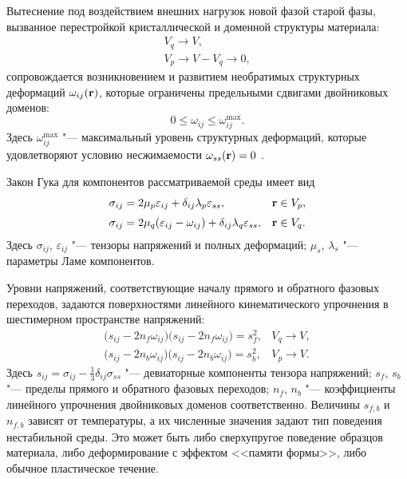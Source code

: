 Вытеснение под воздействием внешних нагрузок новой фазой старой фазы, вызванное перестройкой кристаллической и доменной структуры материала:
\begin{gather*}
V_{q} \to V,\\
V_{p} \to V-V_{q} \to 0,
\end{gather*}
сопровождается возникновением и развитием необратимых структурных деформаций $\omega_{ij}(\bold{r})$, которые ограничены предельными сдвигами двойниковых доменов:
$$
0 \leq \omega_{ij} \leq \omega^{\max}_{ij}.
$$
Здесь  $\omega^{\max}_{ij}$ "--- максимальный уровень структурных деформаций, которые удовлетворяют условию несжимаемости $\omega_{ss}(\bold{r})=0$ .

Закон Гука для компонентов рассматриваемой среды имеет вид 
\begin{equation}
\label{srv:eq1}
\begin{array}{ll}
\sigma_{ij}=2\mu_{p}\varepsilon_{ij}+\delta_{ij}\lambda_{p}\varepsilon_{ss}, & \bold{r} \in V_{p}, \\[2mm]
\sigma_{ij}=2\mu_{q}(\varepsilon_{ij}-\omega_{ij})+\delta_{ij}\lambda_{q}\varepsilon_{ss}, & \bold{r} \in V_{q}.
\end{array}
\end{equation}
Здесь $\sigma_{ij}$, $\varepsilon_{ij}$ "--- тензоры напряжений и полных деформаций; 
$\mu_{s}$, $\lambda_{s}$ "--- параметры Ламе компонентов. 

Уровни напряжений, соответствующие началу прямого и обратного фазовых переходов, задаются поверхностями линейного кинематического упрочнения в шестимерном пространстве напряжений:
\begin{equation}
\label{srv:eq2}
\begin{array}{ll}
\big(s_{ij}-2 n_f \omega_{ij}\big ) \big(s_{ij}-2 n_f \omega_{ij}\big)=s^2_f, & V_q \to V, \\[2mm] 
\big(s_{ij}-2n_b \omega_{ij}\big) \big(s_{ij}-2 n_b \omega_{ij}\big)=s^2_b, & V_p \to V.
\end{array}
\end{equation}
Здесь $s_{ij}=\sigma_{ij}-\frac{1}{3}\delta_{ij}\sigma_{ss}$ "--- девиаторные компоненты тензора напряжений; 
$s_{f}$, $s_{b}$ "--- пределы прямого и обратного фазовых переходов; 
$n_{f}$, $n_{b}$ "--- коэффициенты линейного упрочнения двойниковых доменов  соответственно. 
Величины  $s_{f,b}$ и $n_{f,b}$ зависят от температуры, а их численные значения задают тип поведения нестабильной среды. 
Это может быть либо сверхупругое поведение образцов материала, либо деформирование с эффектом <<памяти формы>>, либо обычное пластическое течение.

